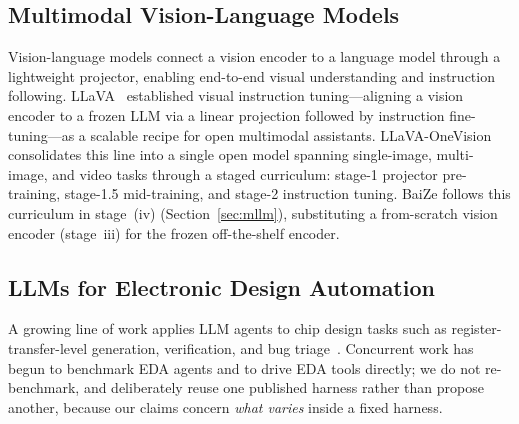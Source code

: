 \subsection{Multimodal Vision-Language Models}
Vision-language models connect a vision encoder to a language model through a lightweight projector, enabling end-to-end visual understanding and instruction following.
LLaVA~\cite{liu2023llava} established visual instruction tuning---aligning a vision encoder to a frozen LLM via a linear projection followed by instruction fine-tuning---as a scalable recipe for open multimodal assistants.
LLaVA-OneVision~\cite{li2024llavaonevision} consolidates this line into a single open model spanning single-image, multi-image, and video tasks through a staged curriculum: stage-1 projector pre-training, stage-1.5 mid-training, and stage-2 instruction tuning.
BaiZe follows this curriculum in stage~(iv) (Section~\ref{sec:mllm}), substituting a from-scratch vision encoder (stage~iii) for the frozen off-the-shelf encoder.

\subsection{LLMs for Electronic Design Automation}
A growing line of work applies LLM agents to chip design tasks such as register-transfer-level generation, verification, and bug triage~\cite{liu2023chipnemo,blocklove2024chip}.
Concurrent work has begun to benchmark EDA agents and to drive EDA tools directly; we do not re-benchmark, and deliberately reuse one published harness rather than propose another, because our claims concern \emph{what varies} inside a fixed harness.

